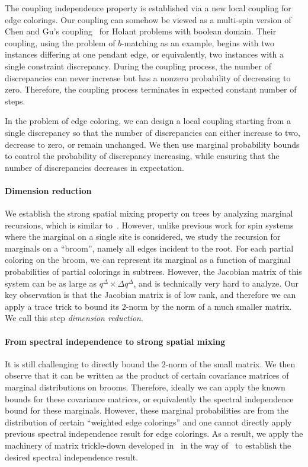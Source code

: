\documentclass[a4paper,11pt]{article}
\begin{document}
The coupling independence property is established via a new local coupling for edge colorings. Our coupling can somehow be viewed as a multi-spin version of Chen and Gu's coupling~\cite{CG24} for Holant problems with boolean domain. Their coupling, using the problem of $b$-matching as an example, begins with two instances differing at one pendant edge, or equivalently, two instances with a single constraint discrepancy. During the coupling process, the number of discrepancies can never increase but has a nonzero probability of decreasing to zero. Therefore, the coupling process terminates in expected constant number of steps. 

In the problem of edge coloring, we can design a local coupling starting from a single discrepancy so that the number of discrepancies can either increase to two, decrease to zero, or remain unchanged. We then use marginal probability bounds to control the probability of discrepancy increasing, while ensuring that the number of discrepancies decreases in expectation. 

\paragraph{Dimension reduction}

We establish the strong spatial mixing property on trees by analyzing marginal recursions, which is similar to~\cite{CLMM23}. However, unlike previous work for spin systems where the marginal on a single site is considered, we study the recursion for marginals on a ``broom'', namely all edges incident to the root. For each partial coloring on the broom, we can represent its marginal as a function of marginal probabilities of partial colorings in subtrees. However, the Jacobian matrix of this system can be as large as $q^\Delta \times \Delta q^\Delta$, and is technically very hard to analyze. Our key observation is that the Jacobian matrix is of low rank, and therefore we can apply a trace trick to bound its $2$-norm by the norm of a much smaller matrix. We call this step \emph{dimension reduction}.

\paragraph{From spectral independence to strong spatial mixing}

It is still challenging to directly bound the $2$-norm of the small matrix. We then observe that it can be written as the product of certain covariance matrices of marginal distributions on brooms. Therefore, ideally we can apply the known bounds for these covariance matrices, or equivalently the spectral independence bound for these marginals. However, these marginal probabilities are from the distribution of certain ``weighted edge colorings'' and one cannot directly apply previous spectral independence result for edge colorings. As a result, we apply the machinery of matrix trickle-down developed in~\cite{ALOG21} in the way of~\cite{WZZ24} to establish the desired spectral independence result. 
\end{document}
